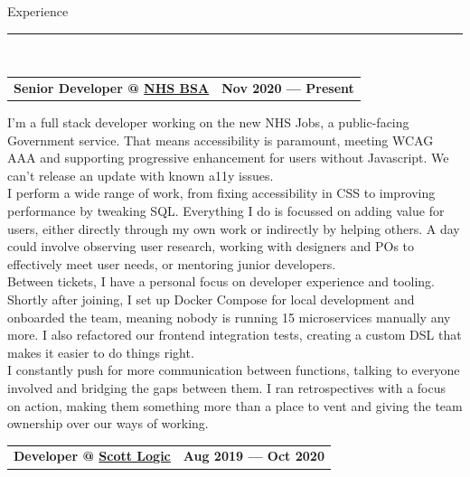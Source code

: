 \documentclass[hidelinks, 12pt, a4paper]{article}
\begin{document}
	\vspace{12pt}

	\begin{Large}Experience\end{Large}
	\rule{200pt}{1pt}\\
	
	\vspace{-2pt}
	
	\begin{tabularx}{\linewidth}{X r}
		\textbf{Senior Developer @ \href{https://www.nhsbsa.nhs.uk/}{NHS BSA}} & \textbf{Nov 2020 --- Present}
	\end{tabularx}\vspace{2pt}

	\hspace{0.05\linewidth}\begin{minipage}{0.95\linewidth}
		I'm a full stack developer working on the new NHS Jobs, a public-facing Government service.
		That means accessibility is paramount, meeting WCAG AAA and supporting progressive enhancement for users without Javascript.
		We can't release an update with known a11y issues.\\
		
		I perform a wide range of work, from fixing accessibility in CSS to improving performance by tweaking SQL.
		Everything I do is focussed on adding value for users, either directly through my own work or indirectly by helping others. A day could involve observing user research, working with designers and POs to effectively meet user needs, or mentoring junior developers.\\
		
		Between tickets, I have a personal focus on developer experience and tooling.
		Shortly after joining, I set up Docker Compose for local development and onboarded the team, meaning nobody is running 15 microservices manually any more.
		I also refactored our frontend integration tests, creating a custom DSL that makes it easier to do things right.\\
		
		I constantly push for more communication between functions, talking to everyone involved and bridging the gaps between them.
		I ran retrospectives with a focus on action, making them something more than a place to vent and giving the team ownership over our ways of working.\\
	\end{minipage}
	
	
	\begin{tabularx}{\linewidth}{X r}
		\textbf{Developer @ \href{https://www.scottlogic.com/}{Scott Logic}} & \textbf{Aug 2019 --- Oct 2020}
	\end{tabularx}\vspace{2pt}
	
\end{document}
